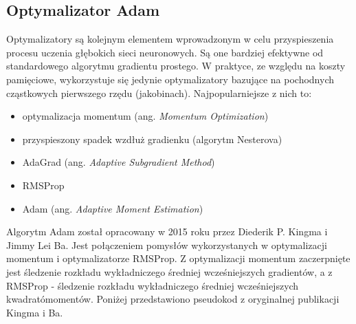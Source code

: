 \documentclass[a4paper,11pt]{article}
\begin{document}
    \subsection{Optymalizator Adam}

    Optymalizatory są kolejnym elementem wprowadzonym w celu przyspieszenia procesu uczenia głębokich sieci neuronowych. Są one bardziej efektywne od standardowego algorytmu gradientu prostego. W praktyce, ze względu na koszty pamięciowe, wykorzystuje się jedynie optymalizatory bazujące na pochodnych cząstkowych pierwszego rzędu (jakobinach)\cite{UczenieMaszynowe2018}. Najpopularniejsze z nich to:
    \begin{itemize}
        \item optymalizacja momentum (ang. \textit{Momentum Optimization})
        \item przyspieszony spadek wzdłuż gradienku (algorytm Nesterova)
        \item AdaGrad (ang. \textit{Adaptive Subgradient Method})
        \item RMSProp
        \item Adam (ang. \textit{Adaptive Moment Estimation})
    \end{itemize}

    \bigskip

    Algorytm Adam został opracowany w 2015 roku przez Diederik P. Kingma i Jimmy Lei Ba\cite{AdamOptimization2015}. Jest połączeniem pomysłów wykorzystanych w optymalizacji momentum i optymalizatorze RMSProp. Z optymalizacji momentum zaczerpnięte jest śledzenie rozkładu wykładniczego średniej wcześniejszych gradientów, a z RMSProp - śledzenie rozkładu wykładniczego średniej wcześniejszych kwadratómomentów\cite{UczenieMaszynowe2018}. Poniżej przedstawiono pseudokod z oryginalnej publikacji Kingma i Ba.

    \bigskip
\end{document}
